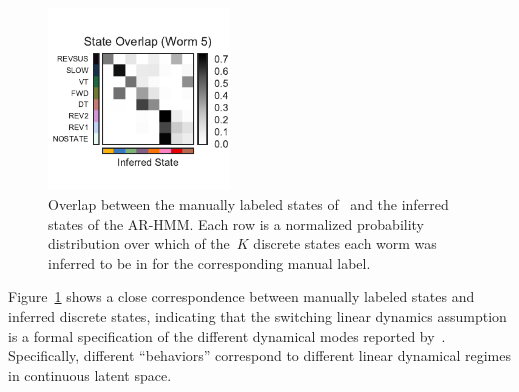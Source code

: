 \documentclass{article}
\begin{document}
\begin{figure}[h]
\includegraphics[width=1.9in]{figures/arhmm/overlap_4.pdf} 
\caption{Overlap between the manually labeled states of~\citet{kato2015global}
  and the inferred states of the AR-HMM. Each row is a normalized probability
  distribution over which of the~$K$ discrete states each worm was inferred to
  be in for the corresponding manual label.}
\label{fig:overlap}
\end{figure}

Figure~\ref{fig:overlap} shows a close correspondence between manually
labeled states and inferred discrete states, indicating that the
switching linear dynamics assumption is a formal specification of the
different dynamical modes reported by~\citet{kato2015global}.
Specifically, different ``behaviors'' correspond to different linear
dynamical regimes in continuous latent space.
\end{document}
